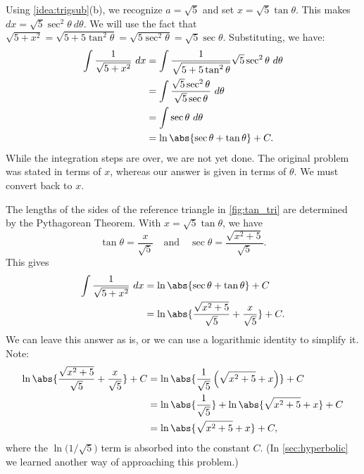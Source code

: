 {Using \autoref{idea:trigsub}(b), we recognize $a=\sqrt{5}$ and  set $x= \sqrt{5}\tan \theta$. This makes $dx = \sqrt{5}\sec^2\theta\ d\theta$. We will use the fact that $\sqrt{5+x^2} = \sqrt{5+5\tan^2\theta} = \sqrt{5\sec^2\theta} = \sqrt{5}\sec\theta.$ Substituting, we have:
\begin{align*}
\int \frac{1}{\sqrt{5+x^2}}\ dx &= \int \frac{1}{\sqrt{5+5\tan^2\theta}}\sqrt{5}\sec^2\theta\ d\theta \\
			&= \int \frac{\sqrt{5}\sec^2\theta}{\sqrt{5}\sec\theta} \ d\theta\\
			&= \int \sec\theta\ d\theta\\
			&= \ln\abs{\sec\theta+\tan\theta}+C.
\end{align*}
While the integration steps are over, we are not yet done. The original problem was stated in terms of $x$, whereas our answer is given in terms of $\theta$. We must convert back to $x$.

The lengths of the sides of the reference triangle in \autoref{fig:tan_tri} are determined by the Pythagorean Theorem. With $x=\sqrt{5}\tan\theta$, we have 
$$\tan \theta = \frac x{\sqrt{5}}\quad \text{and}\quad \sec\theta = \frac{\sqrt{x^2+5}}{\sqrt{5}}.$$
This gives
\begin{align*}
	\int\frac1{\sqrt{5+x^2}}\ dx
	&= \ln\abs{\sec\theta+\tan\theta}+C \\
	&= \ln\abs{\frac{\sqrt{x^2+5}}{\sqrt5}+ \frac x{\sqrt5}}+C.
\end{align*}
We can leave this answer as is, or we can use a logarithmic identity to simplify it. Note:
\begin{align*}
	\ln\abs{\frac{\sqrt{x^2+5}}{\sqrt5}+ \frac x{\sqrt5}}+C
	&= \ln\abs{\frac1{\sqrt5}\left(\sqrt{x^2+5}+ x\right)}+C \\
	&= \ln\abs{\frac1{\sqrt5}} + \ln\abs{\sqrt{x^2+5}+ x}+C\\
	&=	\ln\abs{\sqrt{x^2+5}+ x}+C,
\end{align*}
where the $\ln\big(1/\sqrt5\big)$ term is absorbed into the constant $C$. (In \autoref{sec:hyperbolic} we learned another way of approaching this problem.)}

